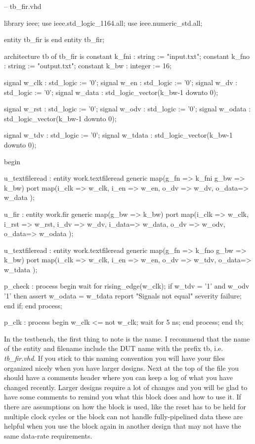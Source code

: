 \begin{VHDLlisting}[tabsize=4]
-- tb_fir.vhd

library ieee;
	use ieee.std_logic_1164.all;
	use ieee.numeric_std.all;
	
entity tb_fir is
end entity tb_fir;

architecture tb of tb_fir is
	constant k_fni : string := "input.txt";
	constant k_fno : string := "output.txt";
	constant k_bw  : integer := 16;

    signal w_clk   : std_logic := '0';
    signal w_en    : std_logic := '0';
    signal w_dv    : std_logic := '0';
    signal w_data  : std_logic_vector(k_bw-1 downto 0);	
    
	signal w_rst   : std_logic := '0';
	signal w_odv   : std_logic := '0';
	signal w_odata : std_logic_vector(k_bw-1 downto 0);	
	
	signal w_tdv   : std_logic := '0';
    signal w_tdata : std_logic_vector(k_bw-1 downto 0);	
    
begin

    u_textfileread : entity work.textfileread
	generic map(g_fn => k_fni
	            g_bw => k_bw)
	port map(i_clk => w_clk,
	         i_en  => w_en,
			 o_dv  => w_dv,
			 o_data=> w_data	
	);
	
	u_fir : entity work.fir
	generic map(g_bw => k_bw)
	port map(i_clk => w_clk,
			 i_rst => w_rst,
			 i_dv  => w_dv,
			 i_data=> w_data,
			 o_dv  => w_odv,
			 o_data=> w_odata	
	);

	u_textfileread : entity work.textfileread
	generic map(g_fn => k_fno
	            g_bw => k_bw)
	port map(i_clk => w_clk,
	         i_en  => w_en,
			 o_dv  => w_tdv,
			 o_data=> w_tdata	
	);
	
	p_check : process
	begin
		wait for rising_edge(w_clk);
		if w_tdv = '1' and w_odv '1' then
			assert w_odata = w_tdata
			report "Signals not equal"
			severity failure;
		end if;
	end process;
	
	p_clk : process
	begin	
		w_clk <= not w_clk;
		wait for 5 ns;
	end process;
end tb;
\end{VHDLlisting}

In the testbench, the first thing to note is the name. I recommend that the name of the entity and filename include the \ac{DUT} name with the prefix tb, i.e. \emph{tb\_fir.vhd}. If you stick to this naming convention you will have your files organized nicely when you have larger designs. Next at the top of the file you should have a comments header where you can keep a log of what you have changed recently. Larger designs require a lot of changes and you will be glad to have some comments to remind you what this block does and how to use it. If there are assumptions on how the block is used, like the reset has to be held for multiple clock cycles or the block can not handle fully-pipelined data these are helpful when you use the block again in another design that may not have the same data-rate requirements.


